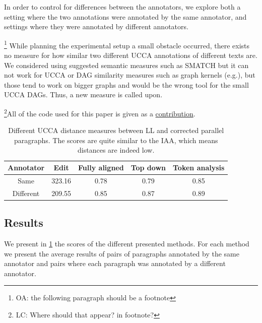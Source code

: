 \documentclass[letter,11pt]{article}
\newcommand{\oa}[1]{\footnote{\color{red}OA: #1}}
\newcommand{\lc}[1]{\footnote{\color{green}LC: #1}}
\begin{document}
		
		
		
		
		
		
		
		
		In order to control for differences between the annotators, we explore both
		a setting where the two annotations were annotated by the same annotator,
		and settings where they were annotated by different annotators.
		
		
		\oa{the following paragraph should be a footnote}
		While planning the experimental setup a small obstacle occurred,
		there exists no measure for how similar two different UCCA annotations of different texts are.
		We considered using suggested semantic measures
		such as SMATCH\cite{cai2013smatch} but it can not work for UCCA or
		DAG similarity measures such as graph kernels (e.g.\cite{kashima2003marginalized}),
		but those tend to work on bigger graphs and would be the wrong tool
		for the small UCCA DAGs. Thus, a new measure is called upon.
		
		
		\lc{Where should that appear? in footnote?}All of the code used for this paper is given as a \href{link will be disclosed upon publication}{contribution}.
		\vspace*{-\baselineskip}
		\begin{table}[h!]
			\centering
			\singlespacing
			\begin{tabular}{c|c|c|c|c}
				Annotator & Edit & Fully aligned & Top down & Token analysis
				\\
				\hline
				Same & 323.16 & 0.78 & 0.79 & 0.85
				\\
				Different & 209.55 & 0.85 & 0.87 & 0.89
				\\
			\end{tabular}
			\caption{Different UCCA distance measures between LL and corrected parallel paragraphs. The scores are quite similar to the IAA, which means distances are indeed low.\label{tab:Distances}}
		\end{table}
		\vspace*{-\baselineskip}
		\subsection{Results}
		
		We present in \ref{tab:Distances} the scores of the different presented
		methods. For each method we present the average results of pairs
		of paragraphs annotated by the same annotator and pairs where each
		paragraph was annotated by a different annotator.
		
\end{document}

